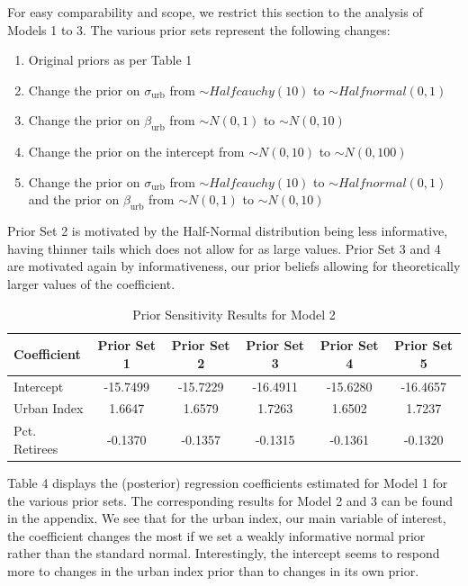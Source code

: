 \documentclass[12pt]{article}
\begin{document}
For easy comparability and scope, we restrict this section to the analysis of Models 1 to 3. The various prior sets represent the following changes:

\begin{enumerate}
    \item Original priors as per Table 1
    \item Change the prior on \(\sigma_\text{urb}\) from \(\sim Halfcauchy(10)\) to \(\sim Halfnormal(0, 1)\)
    \item Change  the prior on \(\beta_\text{urb}\) from \(\sim N(0, 1)\) to \(\sim N(0, 10)\)
    \item Change  the prior on the intercept from \(\sim N(0, 10)\) to \(\sim N(0, 100)\)
    \item Change the prior on \(\sigma_\text{urb}\) from \(\sim Halfcauchy(10)\) to \(\sim Halfnormal(0, 1)\) and the prior on \(\beta_\text{urb}\) from \(\sim N(0, 1)\) to \(\sim N(0, 10)\)
\end{enumerate}

Prior Set 2 is motivated by the Half-Normal distribution being less informative, having thinner tails which does not allow for as large values. Prior Set 3 and 4 are motivated again by informativeness, our prior beliefs allowing for theoretically larger values of the coefficient.


\begin{table}[h]
    \centering
    \begin{tabular}{l|ccccc}
        \hline
        Coefficient & Prior Set 1 & Prior Set 2 & Prior Set 3 & Prior Set 4 & Prior Set 5 \\
        \hline
        Intercept      & -15.7499 & -15.7229 & -16.4911 & -15.6280 & -16.4657 \\
        Urban Index    & 1.6647 & 1.6579 & 1.7263 & 1.6502 & 1.7237 \\
        Pct. Retirees  & -0.1370 & -0.1357 & -0.1315 & -0.1361 & -0.1320 \\
        \hline
    \end{tabular}
    \caption{Prior Sensitivity Results for Model 2}
    \label{tab:Prior Sensitivity Results for Model 1}
\end{table}



Table 4 displays the (posterior) regression coefficients estimated for Model 1 for the various prior sets. The corresponding results for Model 2 and 3 can be found in the appendix. We see that for the urban index, our main variable of interest, the coefficient changes the most if we set a weakly informative normal prior rather than the standard normal. Interestingly, the intercept seems to respond more to changes in the urban index prior than to changes in its own prior.
\end{document}
